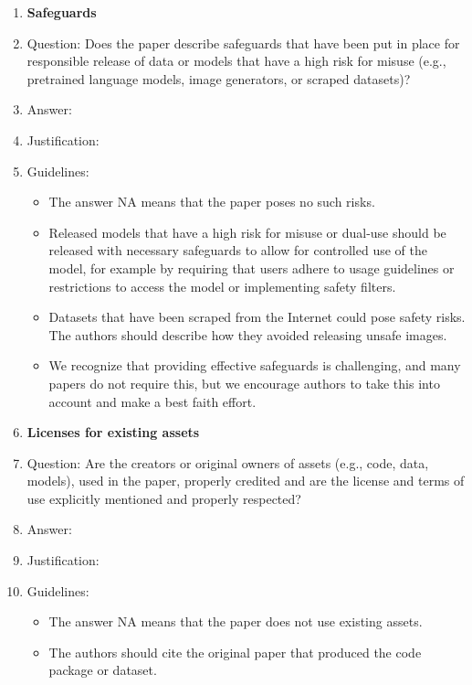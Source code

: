 \documentclass{article}
\begin{document}
\begin{enumerate}
\begin{itemize}
        \end{itemize}
    \item {\bf Safeguards}
    \item[] Question: Does the paper describe safeguards that have been put in place for responsible release of data or models that have a high risk for misuse (e.g., pretrained language models, image generators, or scraped datasets)?
    \item[] Answer: \answerTODO{} %
    \item[] Justification: \justificationTODO{}
    \item[] Guidelines:
        \begin{itemize}
            \item The answer NA means that the paper poses no such risks.
            \item Released models that have a high risk for misuse or dual-use should be released with necessary safeguards to allow for controlled use of the model, for example by requiring that users adhere to usage guidelines or restrictions to access the model or implementing safety filters.
            \item Datasets that have been scraped from the Internet could pose safety risks. The authors should describe how they avoided releasing unsafe images.
            \item We recognize that providing effective safeguards is challenging, and many papers do not require this, but we encourage authors to take this into account and make a best faith effort.
        \end{itemize}
    \item {\bf Licenses for existing assets}
    \item[] Question: Are the creators or original owners of assets (e.g., code, data, models), used in the paper, properly credited and are the license and terms of use explicitly mentioned and properly respected?
    \item[] Answer: \answerTODO{} %
    \item[] Justification: \justificationTODO{}
    \item[] Guidelines:
        \begin{itemize}
            \item The answer NA means that the paper does not use existing assets.
            \item The authors should cite the original paper that produced the code package or dataset.

\end{itemize}
\end{enumerate}
\end{document}
